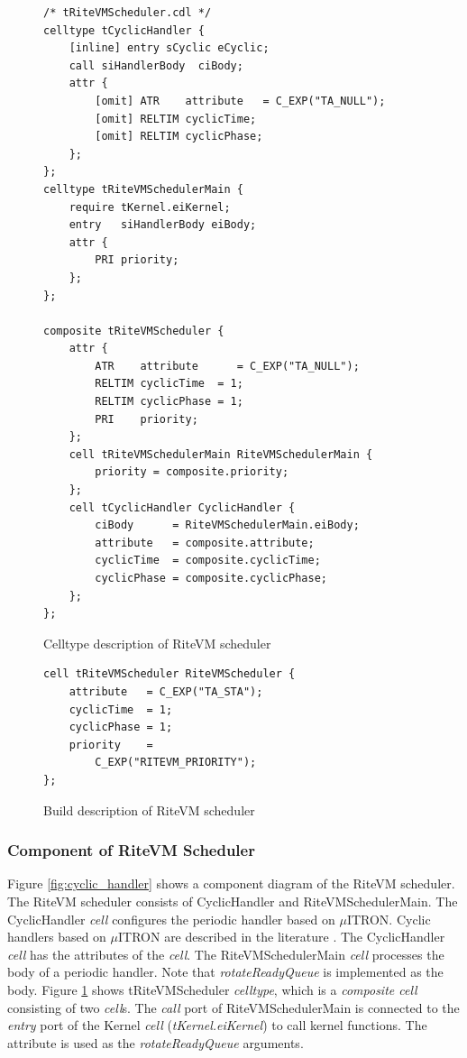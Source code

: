 \documentclass[S,R,E]{article/compsoft}
\begin{document}
\begin{figure}[t]
    \centering
    \begin{lstlisting}
/* tRiteVMScheduler.cdl */
celltype tCyclicHandler {
    [inline] entry sCyclic eCyclic;
    call siHandlerBody  ciBody;
    attr {
        [omit] ATR    attribute   = C_EXP("TA_NULL");
    	[omit] RELTIM cyclicTime;
    	[omit] RELTIM cyclicPhase;
    };
};
celltype tRiteVMSchedulerMain {
    require tKernel.eiKernel;
    entry   siHandlerBody eiBody;
    attr {
        PRI priority;
    };
};

composite tRiteVMScheduler {
    attr {
        ATR    attribute      = C_EXP("TA_NULL");
        RELTIM cyclicTime  = 1;
        RELTIM cyclicPhase = 1;
        PRI    priority;
    };
    cell tRiteVMSchedulerMain RiteVMSchedulerMain {
        priority = composite.priority;
    };
    cell tCyclicHandler CyclicHandler {
        ciBody      = RiteVMSchedulerMain.eiBody;
        attribute   = composite.attribute;
        cyclicTime  = composite.cyclicTime;
        cyclicPhase = composite.cyclicPhase;
    };
};
    \end{lstlisting}
\caption{Celltype description of RiteVM scheduler}
\label{celltype_cyclic_handler}
\end{figure}
\begin{figure}[t]
    \centering
    \begin{lstlisting}
cell tRiteVMScheduler RiteVMScheduler {
    attribute   = C_EXP("TA_STA");
    cyclicTime  = 1;
    cyclicPhase = 1;
    priority    =
        C_EXP("RITEVM_PRIORITY");
};
\end{lstlisting}
\caption{Build description of RiteVM scheduler}
\label{build_cyclic_handler}
\end{figure}

\subsubsection{Component of RiteVM Scheduler}

Figure \ref{fig:cyclic_handler} shows a component diagram of the RiteVM scheduler.
The RiteVM scheduler consists of CyclicHandler and RiteVMSchedulerMain.
The CyclicHandler {\it cell} configures the periodic handler based on $\mu$ITRON.
Cyclic handlers based on $\mu$ITRON are described in the literature \cite{par:microITRON}.
The CyclicHandler {\it cell} has the attributes of the {\it cell}.
The RiteVMSchedulerMain {\it cell} processes the body of a periodic handler.
Note that {\it rotateReadyQueue} is implemented as the body.
Figure \ref{celltype_cyclic_handler} shows tRiteVMScheduler {\it celltype}, which is a {\it composite cell} consisting of two {\it cell}s.
The {\it call} port of RiteVMSchedulerMain is connected to the {\it entry} port of the Kernel {\it cell} ({\it tKernel.eiKernel}) to call kernel functions.
The attribute is used as the {\it rotateReadyQueue} arguments.
\end{document}
